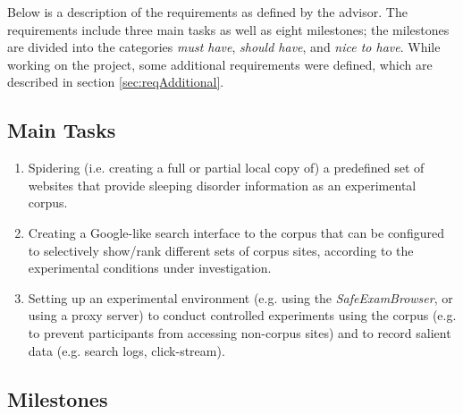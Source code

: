 \documentclass[a4paper]{usiinfbachelorproject}
\begin{document}
Below is a description of the requirements as defined by the advisor. The requirements include three main tasks as well 
as eight milestones; the milestones are divided into the categories \emph{must have}, \emph{should have}, and \emph{nice to have}.
While working on the project, some additional requirements were defined, which are described in section 
\ref{sec:reqAdditional}.

\subsection{Main Tasks} \label{sec:reqTasks}

    \begin{enumerate}

        \item Spidering (i.e. creating a full or partial local copy of) a predefined set of websites that provide
              sleeping disorder information as an experimental corpus. 

        \item Creating a Google-like search interface to the corpus that can be configured to selectively show/rank different sets of
              corpus sites, according to the experimental conditions under investigation.

        \item Setting up an experimental environment (e.g. using the \emph{SafeExamBrowser}, or using a proxy server) to
              conduct controlled experiments using the corpus (e.g. to prevent participants from accessing non-corpus sites)
              and to record salient data (e.g. search logs, click-stream).

    \end{enumerate} 

\subsection{Milestones} \label{sec:reqMilestones}
\end{document}
